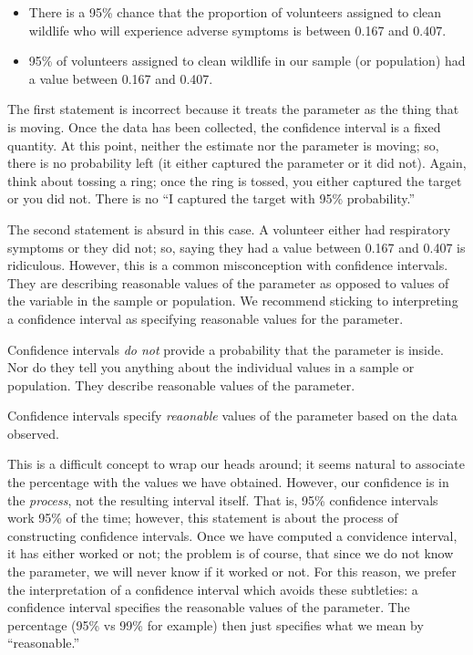 \documentclass[]{book}
\providecommand{\tightlist}{%
  \setlength{\itemsep}{0pt}\setlength{\parskip}{0pt}}
\theoremstyle{plain}
\theoremstyle{mydefn}
\theoremstyle{myexmpl}
\theoremstyle{remark}
\let\BeginKnitrBlock\begin \let\EndKnitrBlock\end
\let\BeginKnitrBlock\begin \let\EndKnitrBlock\end
\begin{document}
\begin{itemize}
\tightlist
\item
  There is a 95\% chance that the proportion of volunteers assigned to
  clean wildlife who will experience adverse symptoms is between 0.167
  and 0.407.
\item
  95\% of volunteers assigned to clean wildlife in our sample (or
  population) had a value between 0.167 and 0.407.
\end{itemize}

The first statement is incorrect because it treats the parameter as the
thing that is moving. Once the data has been collected, the confidence
interval is a fixed quantity. At this point, neither the estimate nor
the parameter is moving; so, there is no probability left (it either
captured the parameter or it did not). Again, think about tossing a
ring; once the ring is tossed, you either captured the target or you did
not. There is no ``I captured the target with 95\% probability.''

The second statement is absurd in this case. A volunteer either had
respiratory symptoms or they did not; so, saying they had a value
between 0.167 and 0.407 is ridiculous. However, this is a common
misconception with confidence intervals. They are describing reasonable
values of the parameter as opposed to values of the variable in the
sample or population. We recommend sticking to interpreting a confidence
interval as specifying reasonable values for the parameter.

\BeginKnitrBlock{rmdtip}
Confidence intervals \emph{do not} provide a probability that the
parameter is inside. Nor do they tell you anything about the individual
values in a sample or population. They describe reasonable values of the
parameter.
\EndKnitrBlock{rmdtip}

\BeginKnitrBlock{rmdkeyidea}
Confidence intervals specify \emph{reaonable} values of the parameter
based on the data observed.
\EndKnitrBlock{rmdkeyidea}

This is a difficult concept to wrap our heads around; it seems natural
to associate the percentage with the values we have obtained. However,
our confidence is in the \emph{process}, not the resulting interval
itself. That is, 95\% confidence intervals work 95\% of the time;
however, this statement is about the process of constructing confidence
intervals. Once we have computed a convidence interval, it has either
worked or not; the problem is of course, that since we do not know the
parameter, we will never know if it worked or not. For this reason, we
prefer the interpretation of a confidence interval which avoids these
subtleties: a confidence interval specifies the reasonable values of the
parameter. The percentage (95\% vs 99\% for example) then just specifies
what we mean by ``reasonable.''
\end{document}
